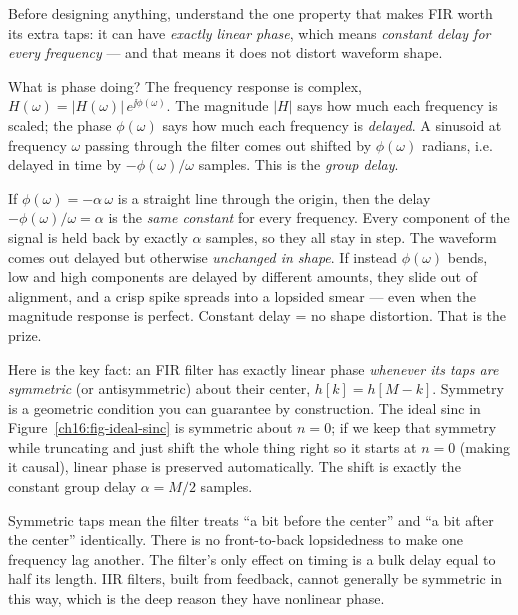 Before designing anything, understand the one property that makes FIR worth its
extra taps: it can have \emph{exactly linear phase}, which means \emph{constant
delay for every frequency} --- and that means it does not distort waveform shape.

What is phase doing? The frequency response is complex,
$H(\omega) = |H(\omega)|\,e^{\jj\phi(\omega)}$. The magnitude $|H|$ says how much
each frequency is scaled; the phase $\phi(\omega)$ says how much each frequency is
\emph{delayed}. A sinusoid at frequency $\omega$ passing through the filter comes
out shifted by $\phi(\omega)$ radians, i.e. delayed in time by
$-\phi(\omega)/\omega$ samples. This is the \emph{group delay}.

\begin{whybox}
If $\phi(\omega) = -\alpha\,\omega$ is a straight line through the origin, then the
delay $-\phi(\omega)/\omega = \alpha$ is the \emph{same constant} for every
frequency. Every component of the signal is held back by exactly $\alpha$ samples,
so they all stay in step. The waveform comes out delayed but otherwise
\emph{unchanged in shape}. If instead $\phi(\omega)$ bends, low and high
components are delayed by different amounts, they slide out of alignment, and a
crisp spike spreads into a lopsided smear --- even when the magnitude response is
perfect. Constant delay = no shape distortion. That is the prize.
\end{whybox}

Here is the key fact: an FIR filter has exactly linear phase \emph{whenever its taps
are symmetric} (or antisymmetric) about their center, $h[k] = h[M-k]$. Symmetry is
a geometric condition you can guarantee by construction. The ideal sinc in
Figure~\ref{ch16:fig-ideal-sinc} is symmetric about $n=0$; if we keep that
symmetry while truncating and just shift the whole thing right so it starts at
$n=0$ (making it causal), linear phase is preserved automatically. The shift is
exactly the constant group delay $\alpha = M/2$ samples.

\begin{intuitionbox}
Symmetric taps mean the filter treats ``a bit before the center'' and ``a bit
after the center'' identically. There is no front-to-back lopsidedness to make one
frequency lag another. The filter's only effect on timing is a bulk delay equal to
half its length. IIR filters, built from feedback, cannot generally be symmetric
in this way, which is the deep reason they have nonlinear phase.
\end{intuitionbox}

